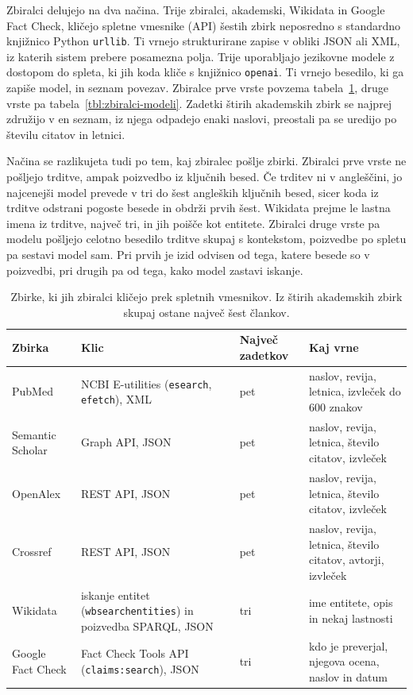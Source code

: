 \documentclass[a4paper, 12pt]{book}
\begin{document}
Zbiralci delujejo na dva načina. Trije zbiralci, akademski, Wikidata in Google Fact Check, kličejo spletne vmesnike (API) šestih zbirk neposredno s standardno knjižnico Python \texttt{urllib}. Ti vrnejo strukturirane zapise v obliki JSON ali XML, iz katerih sistem prebere posamezna polja. Trije uporabljajo jezikovne modele z dostopom do spleta, ki jih koda kliče s knjižnico \texttt{openai}. Ti vrnejo besedilo, ki ga zapiše model, in seznam povezav. Zbiralce prve vrste povzema tabela~\ref{tbl:zadetki}, druge vrste pa tabela~\ref{tbl:zbiralci-modeli}. Zadetki štirih akademskih zbirk se najprej združijo v en seznam, iz njega odpadejo enaki naslovi, preostali pa se uredijo po številu citatov in letnici.

Načina se razlikujeta tudi po tem, kaj zbiralec pošlje zbirki. Zbiralci prve vrste ne pošljejo trditve, ampak poizvedbo iz ključnih besed. Če trditev ni v angleščini, jo najcenejši model prevede v tri do šest angleških ključnih besed, sicer koda iz trditve odstrani pogoste besede in obdrži prvih šest. Wikidata prejme le lastna imena iz trditve, največ tri, in jih poišče kot entitete. Zbiralci druge vrste pa modelu pošljejo celotno besedilo trditve skupaj s kontekstom, poizvedbe po spletu pa sestavi model sam. Pri prvih je izid odvisen od tega, katere besede so v poizvedbi, pri drugih pa od tega, kako model zastavi iskanje.

\begin{table}[H]
\centering
\small
{}
\begin{tabular}{@{}p{}p{}p{}p{}@{}}
\toprule
Zbirka & Klic & Največ zadetkov & Kaj vrne \\
\midrule
PubMed & NCBI E-utilities (\texttt{esearch}, \texttt{efetch}), XML & pet & naslov, revija, letnica, izvleček do 600 znakov \\
\midrule
Semantic Scholar & Graph API, JSON & pet & naslov, revija, letnica, število citatov, izvleček \\
\midrule
OpenAlex & REST API, JSON & pet & naslov, revija, letnica, število citatov, izvleček \\
\midrule
Crossref & REST API, JSON & pet & naslov, revija, letnica, število citatov, avtorji, izvleček \\
\midrule
Wikidata & iskanje entitet (\texttt{wbsearchentities}) in poizvedba SPARQL, JSON & tri & ime entitete, opis in nekaj lastnosti \\
\midrule
Google Fact Check & Fact Check Tools API (\texttt{claims:search}), JSON & tri & kdo je preverjal, njegova ocena, naslov in datum \\
\bottomrule
\end{tabular}
\caption{Zbirke, ki jih zbiralci kličejo prek spletnih vmesnikov. Iz štirih akademskih zbirk skupaj ostane največ šest člankov.}
\label{tbl:zadetki}
\end{table}
\end{document}
